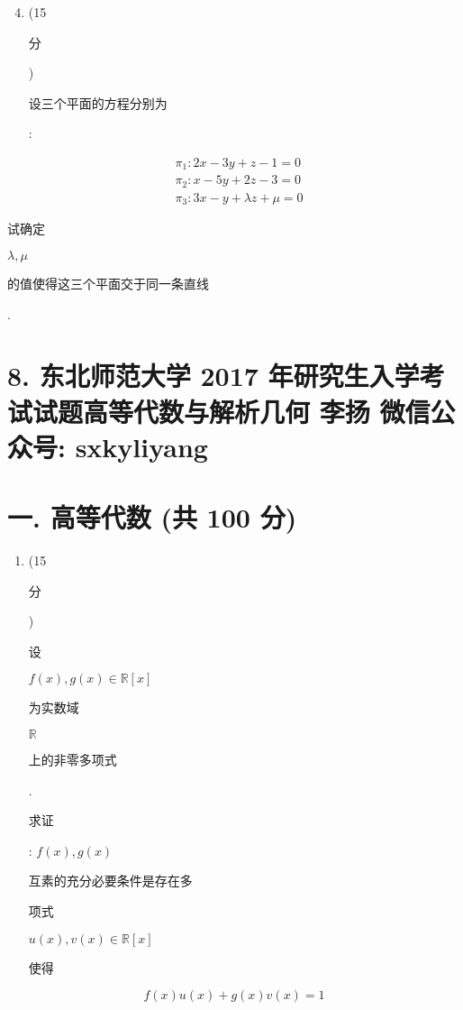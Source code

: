 \documentclass[10pt]{article}
\begin{document}
\begin{enumerate}
  \setcounter{enumi}{3}
  \item (15 \begin{CJK}{UTF8}{mj}分\end{CJK}) \begin{CJK}{UTF8}{mj}设三个平面的方程分别为\end{CJK}:
\end{enumerate}
$$
\begin{aligned}
&\pi_{1}: 2 x-3 y+z-1=0 \\
&\pi_{2}: x-5 y+2 z-3=0 \\
&\pi_{3}: 3 x-y+\lambda z+\mu=0
\end{aligned}
$$
\begin{CJK}{UTF8}{mj}试确定\end{CJK} $\lambda, \mu$ \begin{CJK}{UTF8}{mj}的值使得这三个平面交于同一条直线\end{CJK}.

\section{8. 东北师范大学 2017 年研究生入学考试试题高等代数与解析几何 
 李扬 
 微信公众号: sxkyliyang}
\section{一. 高等代数 (共 100 分)}
\begin{enumerate}
  \item (15 \begin{CJK}{UTF8}{mj}分\end{CJK}) \begin{CJK}{UTF8}{mj}设\end{CJK} $f(x), g(x) \in \mathbb{R}[x]$ \begin{CJK}{UTF8}{mj}为实数域\end{CJK} $\mathbb{R}$ \begin{CJK}{UTF8}{mj}上的非零多项式\end{CJK}. \begin{CJK}{UTF8}{mj}求证\end{CJK}: $f(x), g(x)$ \begin{CJK}{UTF8}{mj}互素的充分必要条件是存在多\end{CJK} \begin{CJK}{UTF8}{mj}项式\end{CJK} $u(x), v(x) \in \mathbb{R}[x]$ \begin{CJK}{UTF8}{mj}使得\end{CJK}
\end{enumerate}
$$
f(x) u(x)+g(x) v(x)=1
$$
\end{document}

